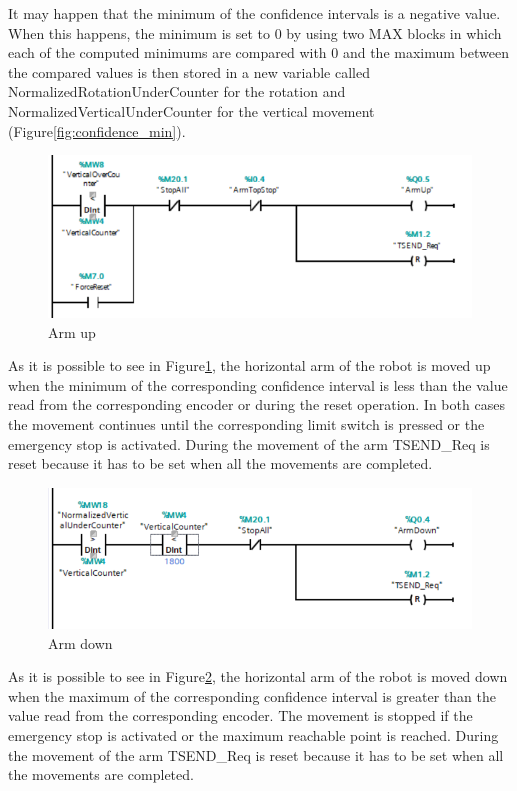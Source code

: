 It may happen that the minimum of the confidence intervals is a negative value. When this happens, the minimum is set to 0 by using two MAX blocks in which each of the computed minimums are compared with 0 and the maximum between the compared values is then stored in a new variable called NormalizedRotationUnderCounter for the rotation and NormalizedVerticalUnderCounter for the vertical movement (Figure\ref{fig:confidence_min}). 


\begin{figure}[!h]
\begin{center}
\includegraphics[width=0.6\linewidth]{capitolo3/figure/Segmento1_6_AU.PNG}
\caption{Arm up}
\label{fig:arm_up}
\end{center}
\end{figure}

As it is possible  to see in Figure\ref{fig:arm_up}, the horizontal arm of the robot is moved up when the minimum of the corresponding confidence interval is less than the value read from the corresponding encoder or during the reset operation. In both cases  the movement continues until the corresponding limit switch is pressed or the emergency stop is activated. During the movement of the arm TSEND\_Req is reset because it has to be set when all the movements are completed.


\begin{figure}[!h]
\begin{center}
\includegraphics[width=0.6\linewidth]{capitolo3/figure/Segmento1_5_AD.PNG}
\caption{Arm down}
\label{fig:arm_down}
\end{center}
\end{figure}

As it is possible  to see in Figure\ref{fig:arm_down}, the horizontal arm of the robot is moved down when the maximum of the corresponding confidence interval is greater than the value read from the corresponding encoder. The movement is stopped if the emergency stop is activated or the maximum reachable point is reached. During the movement of the arm TSEND\_Req is reset because it has to be set when all the movements are completed.


